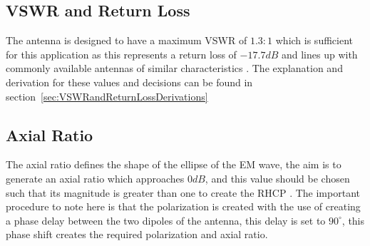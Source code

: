 \documentclass[11pt]{witseiepaper}
\begin{document}
\begin{bibunit}[witseie]
\subsection{VSWR and Return Loss} \label{sec:VSWRandReturnLoss}
The antenna is designed to have a maximum VSWR of $1.3:1$ which is sufficient for this application as this represents a return loss of $-17.7 dB$ and lines up with commonly available antennas of similar characteristics \cite{AntennaPrice1,AntennaPrice2,AntennaPrice3,AntennaPrice4}. The explanation and derivation for these values and decisions can be found in section~\ref{sec:VSWRandReturnLossDerivations}

\subsection{Axial Ratio} \label{sec:AxialRatio}
The axial ratio defines the shape of the ellipse of the EM wave, the aim is to generate an axial ratio which approaches $0 dB$, and this value should be chosen such that its magnitude is greater than one to create the RHCP \cite[p.~32]{crossedDipoleDesign}.
The important procedure to note here is that the polarization is created with the use of creating a phase delay between the two dipoles of the antenna, this delay is set to $90^{\circ}$, this phase shift creates the required polarization and axial ratio. 


\end{bibunit}
\end{document}
